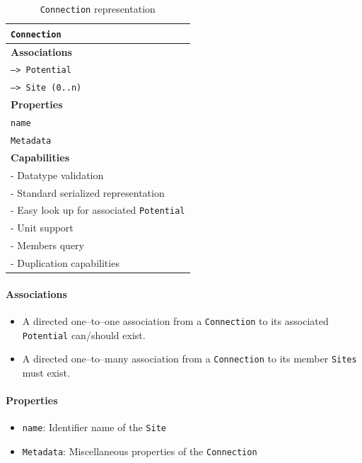 \documentclass[12pt]{article}
\begin{document}
\begin{table}[ht]
    \centering
     \caption{\texttt{Connection} representation}
    \begin{tabular}{|l|}
         \hline
         \rowcolor{gray!50}
         \texttt{Connection}  \\
         \hline
         \textbf{Associations} \\
         \hline
         \texttt{--> Potential}\\
         \texttt{--> Site (0..n)}\\
         \textbf{Properties}\\
         \hline
         \texttt{name} \\
         \texttt{Metadata}\\
         \hline
         \textbf{Capabilities}\\
         \hline
         - Datatype validation \\
         - Standard serialized representation \\
         - Easy look up for associated \texttt{Potential} \\
         - Unit support \\
         - Members query \\
         - Duplication capabilities \\
        \hline
    \end{tabular}
    \label{tab:ConnSpec}
\end{table}

\paragraph{Associations}
\begin{itemize}
    \item A directed one–to–one association from a \texttt{Connection} to its associated \texttt{Potential} can/should exist.
    \item A directed one--to--many association from a \texttt{Connection} to its member \texttt{Sites} must exist.
\end{itemize}
\paragraph{Properties}
\begin{itemize}
    \item \texttt{name}: Identifier name of the \texttt{Site}
    \item \texttt{Metadata}: Miscellaneous properties of the \texttt{Connection}
\end{itemize}
\end{document}
